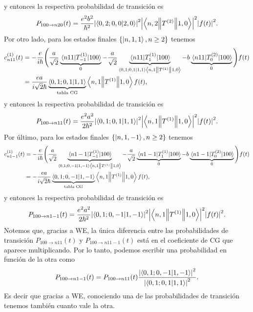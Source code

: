 \documentclass[10pt, a4paper]{article}
\numberwithin{equation}{subsection}
\begin{document}
y entonces la respectiva probabilidad de transición es
\begin{equation}
  P_{100 \to n20}(t)
  = \frac{e^2b^2}{\hbar^2} \abs{\braket{0,2;0,0}{2,0}}^2
    \abs{\left\langle{n,2}\middle\|{T^{(2)}}\middle\|{1,0}\right\rangle}^2 \abs{f(t)}^2.
\end{equation}
Por otro lado, para los estados finales $\set{\ket{n,1,1}, n\geq2}$ tenemos
\begin{align}
  c^{(1)}_{n11}(t)
  &= -\frac{e}{i\hbar} 
    \Bigg(\frac{a}{\sqrt{2}} \underbrace{\matrixel{n11}{T^{(1)}_{-1}}{100}}_{0}
    - \frac{a}{\sqrt{2}}
    \underbrace{\matrixel{n11}{T^{(1)}_{1}}{100}}_{\braket{0,1;0,1}{1,1}
    \doublebarmel{n,1}{T^{(1)}}{1,0}}
    -b \underbrace{\matrixel{n11}{T^{(2)}_{0}}{100}}_{0} \Bigg) f(t) \nonumber \\
  &= \frac{ea}{i\sqrt{2}\hbar} \underbrace{\braket{0,1;0,1}{1,1}}_{\text{tabla
    CG}} \doublebarmel{n,1}{T^{(1)}}{1,0} f(t),
\end{align}
y entonces la respectiva probabilidad de transición es
\begin{equation}
  P_{100 \to n11}(t)
  = \frac{e^2a^2}{2\hbar^2} \abs{\braket{0,1;0,1}{1,1}}^2
    \abs{\left\langle{n,1}\middle\|{T^{(1)}}\middle\|{1,0}\right\rangle}^2 \abs{f(t)}^2.
\end{equation}
Por último, para los estados finales $\set{\ket{n,1,-1}, n\geq2}$ tenemos
\begin{align}
  c^{(1)}_{n1-1}(t)
  &= -\frac{e}{i\hbar} 
    \Bigg(\frac{a}{\sqrt{2}}
    \underbrace{\matrixel{n1-1}{T^{(1)}_{-1}}{100}}_{\braket{0,1;0,-1}{1,-1}
    \doublebarmel{n,1}{T^{(1)}}{1,0}}
    - \frac{a}{\sqrt{2}}
    \underbrace{\matrixel{n1-1}{T^{(1)}_{1}}{100}}_{0}
    -b \underbrace{\matrixel{n1-1}{T^{(2)}_{0}}{100}}_{0} \Bigg) f(t) \nonumber \\
  &= -\frac{ea}{i\sqrt{2}\hbar}
  \underbrace{\braket{0,1;0,-1}{1,-1}}_{\text{tabla CG}}
  \doublebarmel{n,1}{T^{(1)}}{1,0} f(t),
\end{align}
y entonces la respectiva probabilidad de transición es
\begin{equation}
  P_{100 \to n1-1}(t)
  = \frac{e^2a^2}{2\hbar^2} \abs{\braket{0,1;0,-1}{1,-1}}^2
    \abs{\left\langle{n,1}\middle\|{T^{(1)}}\middle\|{1,0}\right\rangle}^2 \abs{f(t)}^2.
\end{equation}
Notemos que, gracias a WE, la única diferencia entre las probabilidades de
transición $P_{100 \to n11}(t)$ y $P_{100 \to n11-1}(t)$ está en el coeficiente
de CG que aparece multiplicando. Por lo tanto, podemos escribir una
probabilidad en función de la otra como
\begin{equation}
  P_{100 \to n1-1}(t) = P_{100 \to n11}(t)
  \frac{\abs{\braket{0,1;0,-1}{1,-1}}^2}{\abs{\braket{0,1;0,1}{1,1}}^2}.
\end{equation}
Es decir que gracias a WE, conociendo una de las probabilidades de transición
tenemos también cuanto vale la otra.

\end{document}
